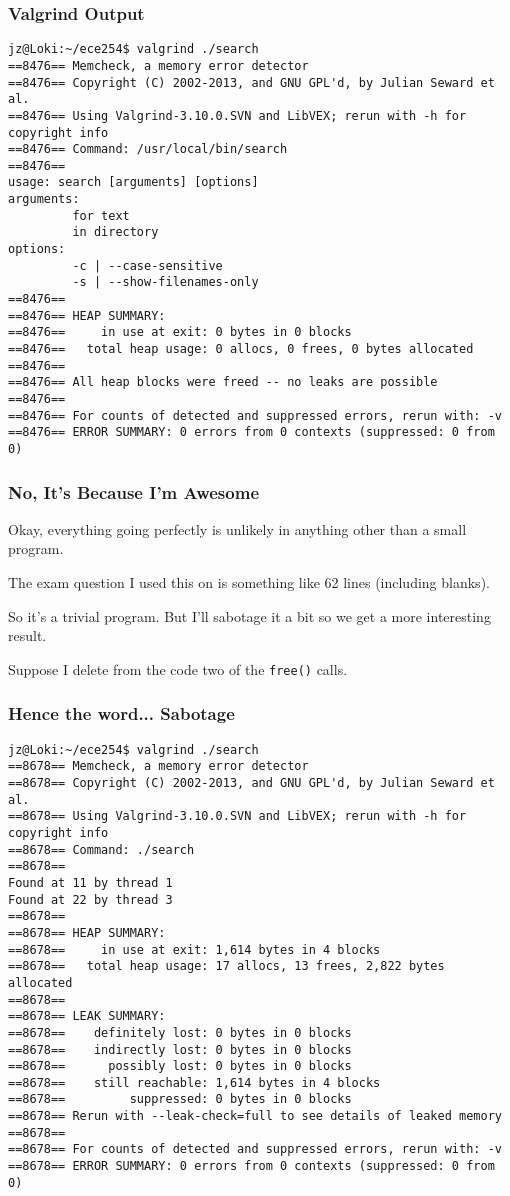 \begin{frame}[fragile]
\frametitle{Valgrind Output}
{\scriptsize
\begin{verbatim}
jz@Loki:~/ece254$ valgrind ./search
==8476== Memcheck, a memory error detector
==8476== Copyright (C) 2002-2013, and GNU GPL'd, by Julian Seward et al.
==8476== Using Valgrind-3.10.0.SVN and LibVEX; rerun with -h for copyright info
==8476== Command: /usr/local/bin/search
==8476== 
usage: search [arguments] [options]
arguments:
         for text
         in directory
options:
         -c | --case-sensitive
         -s | --show-filenames-only
==8476== 
==8476== HEAP SUMMARY:
==8476==     in use at exit: 0 bytes in 0 blocks
==8476==   total heap usage: 0 allocs, 0 frees, 0 bytes allocated
==8476== 
==8476== All heap blocks were freed -- no leaks are possible
==8476== 
==8476== For counts of detected and suppressed errors, rerun with: -v
==8476== ERROR SUMMARY: 0 errors from 0 contexts (suppressed: 0 from 0)
\end{verbatim}
}

\end{frame}

\begin{frame}
\frametitle{No, It's Because I'm Awesome}

Okay, everything going perfectly is unlikely in anything other than a small program. 

The exam question I used this on is something like 62 lines (including blanks). 

So it's a trivial program. But I'll sabotage it a bit so we get a more interesting result. 

Suppose I delete from the code two of the \texttt{free()} calls.

\end{frame}

\begin{frame}[fragile]
\frametitle{Hence the word... Sabotage}
{\scriptsize
\begin{verbatim}
jz@Loki:~/ece254$ valgrind ./search 
==8678== Memcheck, a memory error detector
==8678== Copyright (C) 2002-2013, and GNU GPL'd, by Julian Seward et al.
==8678== Using Valgrind-3.10.0.SVN and LibVEX; rerun with -h for copyright info
==8678== Command: ./search
==8678== 
Found at 11 by thread 1 
Found at 22 by thread 3 
==8678== 
==8678== HEAP SUMMARY:
==8678==     in use at exit: 1,614 bytes in 4 blocks
==8678==   total heap usage: 17 allocs, 13 frees, 2,822 bytes allocated
==8678== 
==8678== LEAK SUMMARY:
==8678==    definitely lost: 0 bytes in 0 blocks
==8678==    indirectly lost: 0 bytes in 0 blocks
==8678==      possibly lost: 0 bytes in 0 blocks
==8678==    still reachable: 1,614 bytes in 4 blocks
==8678==         suppressed: 0 bytes in 0 blocks
==8678== Rerun with --leak-check=full to see details of leaked memory
==8678== 
==8678== For counts of detected and suppressed errors, rerun with: -v
==8678== ERROR SUMMARY: 0 errors from 0 contexts (suppressed: 0 from 0)
\end{verbatim}
}

\end{frame}


